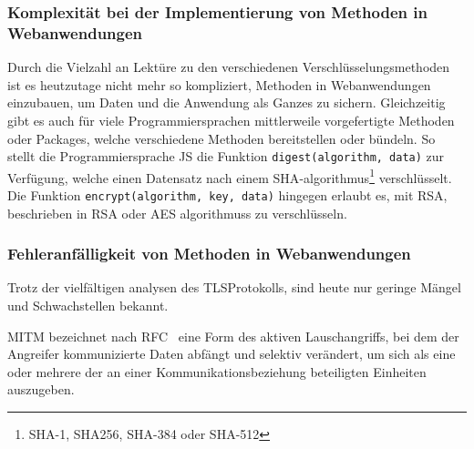 \subsubsection[Komplexität bei der Implementierung von kryptografischen Methoden]{Komplexität bei der Implementierung von  Methoden in Webanwendungen}\label{subsubsec:komplexitaet_bei_der_implementierung_von_Kryptografischen_methoden_in_webanwendungen}
Durch die Vielzahl an Lektüre zu den verschiedenen Verschlüsselungsmethoden\autocites[\zb][]{davies2011implementing} ist es heutzutage nicht mehr so kompliziert,  Methoden in Webanwendungen einzubauen, um Daten und die Anwendung als Ganzes zu sichern.
Gleichzeitig gibt es auch für viele Programmiersprachen mittlerweile vorgefertigte Methoden oder Packages, welche verschiedene  Methoden bereitstellen oder bündeln.
So stellt die Programmiersprache \ac{JS} die Funktion \lstinline!digest(algorithm, data)! zur Verfügung, welche einen Datensatz nach einem \ac{SHA}-\gls{algorithmus}\footnote{\ac{SHA}-1, \gls{SHA256}, \ac{SHA}-384 oder \ac{SHA}-512} verschlüsselt.\autocite[\vglf][]{SubtleCr83:online}
Die Funktion \lstinline!encrypt(algorithm, key, data)! hingegen erlaubt es, mit RSA, beschrieben in \ac{RSA} oder \ac{AES} \glspl{algorithmus} zu verschlüsseln.

\subsubsection[Fehleranfälligkeit von kryptografischen Methoden in Webanwendungen]{Fehleranfälligkeit von  Methoden in Webanwendungen}\label{subsubsec:fehleranfaelligkeit_von_Kryptografischen_methoden_in_webanwendungen}
Trotz der vielfältigen analysen des \ac{TLS}\nonbreakdash Protokolls\autocites[Siehe \zb][]{krawczyk2013security, paulson1999inductive, dowling2015cryptographic, cremers2017comprehensive}, sind heute nur geringe Mängel und Schwachstellen bekannt.\autocite[\vglf][]{OPPLIGER20062238}

\begin{definition}
    \ac{MITM} bezeichnet nach \ac{RFC}\ \autocite[Übersetzt aus][]{rfc2828} eine Form des aktiven Lauschangriffs, bei dem der Angreifer kommunizierte Daten abfängt und selektiv verändert, um sich als eine oder mehrere der an einer Kommunikationsbeziehung beteiligten Einheiten auszugeben.
\end{definition}

